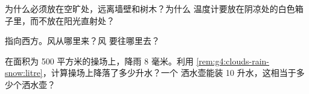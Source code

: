 \begin{exercise}[$\star\star$]\label{exo:g4:clouds-rain-snow:9}
为什么必须放在空旷处，远离墙壁和树木？为什么
温度计要放在阴凉处的白色箱子里，而不放在阳光直射处？
\end{exercise}

\begin{exercise}[$\star\star$]\label{exo:g4:clouds-rain-snow:10}
指向西方。风从哪里来？风
要往哪里去？
\end{exercise}

\begin{exercise}[$\star\star\star$]\label{exo:g4:clouds-rain-snow:11}
在面积为 500 平方米的操场上，降雨 8 毫米。利用
\cref{rem:g4:clouds-rain-snow:litre}，计算操场上降落了多少升水？一个
洒水壶能装 10 升水，这相当于多少个洒水壶？
\end{exercise}
